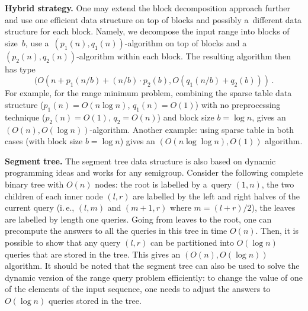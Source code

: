 \documentclass[11pt]{article}
\numberwithin{equation}{section}
\theoremstyle{definition}
\theoremstyle{plain}
\newcommand{\ie}{i.\,e.}
\theoremstyle{plain}\newtheorem{observation}[theorem]{Observation}
\begin{document}
\textbf{Hybrid strategy.} One may extend the block decomposition
approach further and use one efficient data structure on top of
blocks and possibly a~different data structure for each block.
Namely, we decompose the input range into blocks of size~$b$,
use a~$(p_1(n), q_1(n))$-algorithm on top of blocks and
a~$(p_2(n), q_2(n))$-algorithm within each block. The resulting algorithm then
has type
\[(O(n + p_1(n / b) + (n / b) \cdot p_2(b), O(q_1(n/b) + q_2(b))) \, .\]
For example, for the range minimum problem, combining the sparse table data
structure ($p_1(n)=O(n\log n)$, $q_1(n)=O(1)$) with no preprocessing technique
($p_2(n)=O(1)$, $q_2=O(n)$) and block size $b=\log n$, gives
an~$(O(n), O(\log n))$-algorithm. Another example: using sparse table in both
cases (with block size $b=\log n$) gives an $(O(n\log\log n), O(1))$ algorithm.

%

\textbf{Segment tree.} The segment tree data structure is also based on dynamic
programming ideas and works for any semigroup. Consider the following complete
binary tree with $O(n)$ nodes: the root is labelled by a~query $(1,n)$, the two
children of each inner node $(l,r)$ are labelled by the left and right halves of
the current query (\ie, $(l,m)$ and $(m+1,r)$ where $m=(l+r)/2$), the leaves
are labelled by length one queries. Going from leaves to the root, one can
precompute the answers to all the queries in this tree in time $O(n)$. Then, it
is possible to show that any query $(l,r)$ can be  partitioned into $O(\log n)$
queries that are stored in the tree. This gives an $(O(n), O(\log n))$
algorithm. It should be noted that the segment tree can also be used to solve
the dynamic version of the
%
%
range query
problem efficiently: to change the
value of one of the elements of the input sequence, one needs to adjust the
answers to $O(\log n)$ queries stored in the tree.
\end{document}
